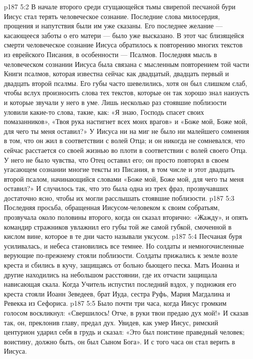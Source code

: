 \vs p187 5:2 В начале второго среди сгущающейся тьмы свирепой песчаной бури Иисус стал терять человеческое сознание. Последние слова милосердия, прощения и напутствия были им уже сказаны. Его последнее желание --- касающееся заботы о его матери --- было уже высказано. В этот час близящейся смерти человеческое сознание Иисуса обратилось к повторению многих текстов из еврейского Писания, в особенности --- Псалмов. Последняя мысль в человеческом сознании Иисуса была связана с мысленным повторением той части Книги псалмов, которая известна сейчас как двадцатый, двадцать первый и двадцать второй псалмы. Его губы часто шевелились, хотя он был слишком слаб, чтобы вслух произносить слова тех текстов, которые он так хорошо знал наизусть и которые звучали у него в уме. Лишь несколько раз стоявшие поблизости уловили какие\hyp{}то слова, такие, как: «Я знаю, Господь спасет своих помазанников», «Твоя рука настигнет всех моих врагов» и «Боже мой, Боже мой, для чего ты меня оставил?» У Иисуса ни на миг не было ни малейшего сомнения в том, что он жил в соответствии с волей Отца; и он никогда не сомневался, что сейчас расстается со своей жизнью во плоти в соответствии с волей своего Отца. У него не было чувства, что Отец оставил его; он просто повторял в своем угасающем сознании многие тексты из Писания, в том числе и этот двадцать второй псалом, начинающийся словами «Боже мой, Боже мой, для чего ты меня оставил?» И случилось так, что это была одна из трех фраз, прозвучавших достаточно ясно, чтобы их могли расслышать стоявшие поблизости.
\vs p187 5:3 \pc Последняя просьба, обращенная Иисусом\hyp{}человеком к своим собратьям, прозвучала около половины второго, когда он сказал вторично: «Жажду», и опять командир стражников увлажнил его губы той же самой губкой, смоченной в кислом вине, которое в те дни часто называли уксусом.
\vs p187 5:4 \pc Песчаная буря усиливалась, и небеса становились все темнее. Но солдаты и немногочисленные верующие по\hyp{}прежнему стояли поблизости. Солдаты прижались к земле возле креста и сбились в кучу, защищаясь от больно бьющего песка. Мать Иоанна и другие находились на небольшом расстоянии, где их отчасти защищала нависающая скала. Когда Учитель испустил последний вздох, у подножия его креста стояли Иоанн Зеведеев, брат Иуда, сестра Руфь, Мария Магдалина и Ревекка из Сефориса.
\vs p187 5:5 Было почти три часа, когда Иисус громким голосом воскликнул: «Свершилось! Отче, в руки твои предаю дух мой!» И сказав так, он, преклонив главу, предал дух. Увидев, как умер Иисус, римский центурион ударил себя в грудь и сказал: «Это был поистине праведный человек; воистину, должно быть, он был Сыном Бога». И с того часа он стал верить в Иисуса.
